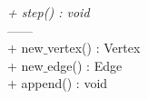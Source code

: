 {

}
{
 \textit{+ step() : void} \\

 
 ------\\
 
 + new$\_$vertex() : Vertex \\
 + new$\_$edge() : Edge \\
 + append() : void \\

}